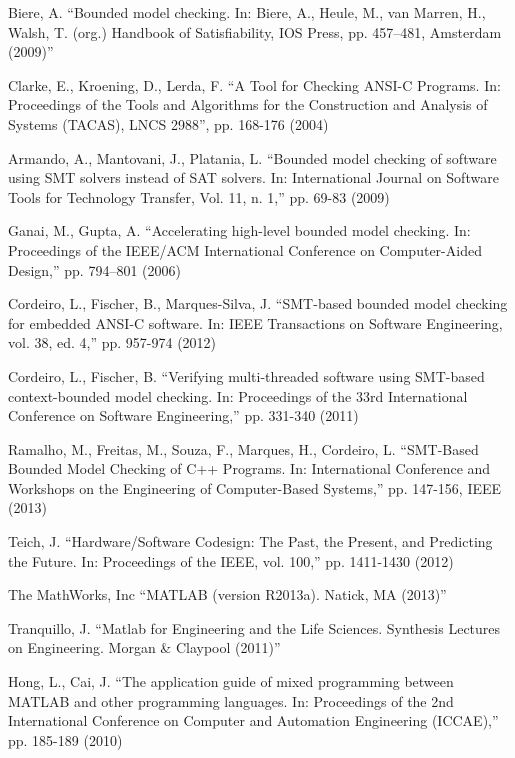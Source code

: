\begin{thebibliography}{5}
Biere, A. ``{Bounded model checking. In: Biere, A., Heule, M., van Marren, H., Walsh, T. (org.) Handbook of Satisfiability, IOS Press, pp. 457–481, Amsterdam (2009)}''

Clarke, E., Kroening, D., Lerda, F. ``{A Tool for Checking ANSI-C Programs. In: Proceedings of the Tools and Algorithms for the Construction and Analysis of Systems (TACAS), LNCS 2988}'', pp. 168-176 (2004)

Armando, A., Mantovani, J., Platania, L. ``{Bounded model checking of software using SMT solvers instead of SAT solvers. In: International Journal on Software Tools for Technology Transfer, Vol. 11, n. 1},'' pp. 69-83 (2009)

Ganai, M., Gupta, A. ``{Accelerating high-level bounded model checking. In: Proceedings of the IEEE/ACM International Conference on Computer-Aided Design},'' pp. 794–801 (2006)

Cordeiro, L., Fischer, B., Marques-Silva, J. ``{SMT-based bounded model checking for embedded ANSI-C software. In: IEEE Transactions on Software Engineering, vol. 38, ed. 4},'' pp. 957-974 (2012)

Cordeiro, L., Fischer, B. ``{Verifying multi-threaded software using SMT-based context-bounded model checking. In: Proceedings of the 33rd International Conference on Software Engineering},'' pp. 331-340 (2011)

Ramalho, M., Freitas, M., Souza, F., Marques, H., Cordeiro, L. ``{SMT-Based Bounded Model Checking of C++ Programs. In: International Conference and Workshops on the Engineering of Computer-Based Systems},'' pp. 147-156, IEEE (2013)

Teich, J. ``{Hardware/Software Codesign: The Past, the Present, and Predicting the Future. In: Proceedings of the IEEE, vol. 100},'' pp. 1411-1430 (2012)

The MathWorks, Inc ``{MATLAB (version R2013a). Natick, MA (2013)}''

Tranquillo, J. ``{Matlab for Engineering and the Life Sciences. Synthesis Lectures on Engineering. Morgan \& Claypool (2011)}''

Hong, L., Cai, J. ``{The application guide of mixed programming between MATLAB and other programming languages. In: Proceedings of the 2nd International Conference on Computer and Automation Engineering (ICCAE)},'' pp. 185-189 (2010)


\end{thebibliography}
